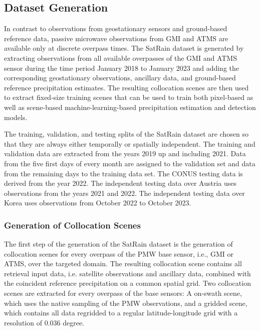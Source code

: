 \documentclass[11pt]{article}
\begin{document}
\subsection{Dataset Generation}

In contrast to observations from geostationary sensors and ground-based reference data, passive microwave observations from GMI and ATMS are available only at discrete overpass times. The SatRain dataset is generated by extracting observations from all available overpasses of the GMI and ATMS sensor during the time period January 2018 to January 2023 and adding the corresponding geostationary observations, ancillary data, and ground-based reference precipitation estimates. The resulting collocation scenes are then used to extract fixed-size training scenes that can be used to train both pixel-based as well as scene-based machine-learning-based precipitation estimation and detection models.

The training, validation, and testing splits of the SatRain dataset are chosen so that they are always either temporally or spatially independent. The training and validation data are extracted from the years 2019 up and including 2021. Data from the five first days of every month are assigned to the validation set and data from the remaining days to the training data set. The CONUS testing data is derived from the year 2022. The independent testing data over Austria uses observations from the years 2021 and 2022. The independent testing data over Korea uses observations from October 2022 to October 2023.

\subsubsection{Generation of Collocation Scenes}

The first step of the generation of the SatRain dataset is the generation of
collocation scenes for every overpass of the PMW base sensor, i.e., GMI or ATMS,
over the targeted domain. The resulting collocation scene contains all retrieval
input data, i.e. satellite observations and ancillary data, combined with the
coincident reference precipitation on a common spatial grid. Two collocation
scenes are extracted for every overpass of the base sensors: A on-swath scene,
which uses the native sampling of the PMW observations, and a gridded scene,
which contains all data regridded to a regular latitude-longitude grid with a
resolution of 0.036 degree.
\end{document}
